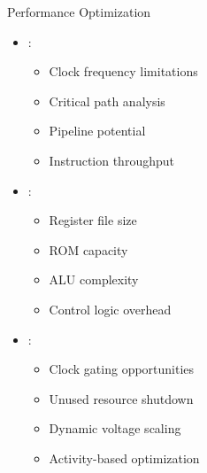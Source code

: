 \begin{frame}{Performance Optimization}
\begin{itemize}
\item {}:
\begin{itemize}
\item Clock frequency limitations
\item Critical path analysis
\item Pipeline potential
\item Instruction throughput
\end{itemize}
\vspace{0.5cm}
\item {}:
\begin{itemize}
\item Register file size
\item ROM capacity
\item ALU complexity
\item Control logic overhead
\end{itemize}
\vspace{0.3cm}
\item {}:
\begin{itemize}
\item Clock gating opportunities
\item Unused resource shutdown
\item Dynamic voltage scaling
\item Activity-based optimization
\end{itemize}
\end{itemize}
\end{frame}

